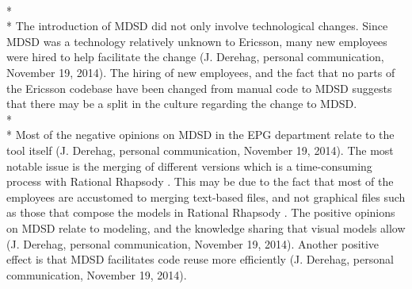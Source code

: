 \documentclass[final_report_innit.tex]{subfiles}
\begin{document}
\\* 
\\* 
The introduction of MDSD did not only involve technological changes. Since MDSD was a technology relatively unknown to Ericsson, many new employees were hired to help facilitate the change (J. Derehag, personal communication, November 19, 2014). The hiring of new employees, and the fact that no parts of the Ericsson codebase have been changed from manual code to MDSD suggests that there may be a split in the culture regarding the change to MDSD. 
\\* 
\\* 
Most of the negative opinions on MDSD in the EPG department relate to the tool \cite{rrf} itself (J. Derehag, personal communication, November 19, 2014). The most notable issue is the merging of different versions which is a time-consuming process with Rational Rhapsody \cite{rrf}. This may be due to the fact that most of the employees are accustomed to merging text-based files, and not graphical files such as those that compose the models in Rational Rhapsody \cite{rrf}. The positive opinions on MDSD relate to modeling, and the knowledge sharing that visual models allow (J. Derehag, personal communication, November 19, 2014). Another positive effect is that MDSD facilitates code reuse more efficiently (J. Derehag, personal communication, November 19, 2014). 
\end{document}
